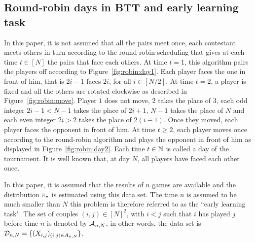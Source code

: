 \subsection{Round-robin days in BTT and early learning task}
In this paper, it is not assumed that all the pairs meet once, each contestant meets others in turn according to  the round-robin scheduling that gives at each time $t\in[N]$ the pairs that face each others. At time $t=1$, this algorithm pairs the players off according to Figure~\ref{fig:robin:day1}. Each player faces the one in front of him, that is $2i-1$ faces $2i$, for all $i\in[N/2]$. At time $t=2$, a player is fixed and all the others are rotated clockwise as described in Figure~\ref{fig:robin:move}. Player $1$ does not move, $2$ takes the place of $3$, each odd integer $2i-1<N-1$ takes the place of $2i+1$, $N-1$ takes the place of $N$ and each even integer $2i>2$ takes the place of $2(i-1)$. Once they moved, each player faces the opponent in front of him. At time $t\ge 2$, each player moves once according to the round-robin algorithm and plays the opponent in front of him as displayed in Figure~\ref{fig:robin:day2}. Each time $t\in\mathbb{N}$ is called a day of the tournament. It is well known that, at day $N$, all players have faced each other once. 

In this paper, it is assumed that the results of $n$ games are available and the distribution $\pi_{\star}$ is estimated using this data set. The time $n$ is assumed to be much smaller than $N$ this problem is therefore referred to as the ``early learning task". The set of couples $(i,j)\in[N]^2$, with $i<j$ such that $i$ has played $j$ before time $n$ is denoted by $\mathcal{A}_{n,N}$, in other words, the data set is $\mathcal{D}_{n,N}=\{(X_{i,j})_{(i,j)\in A_{n,N}}\}$.

